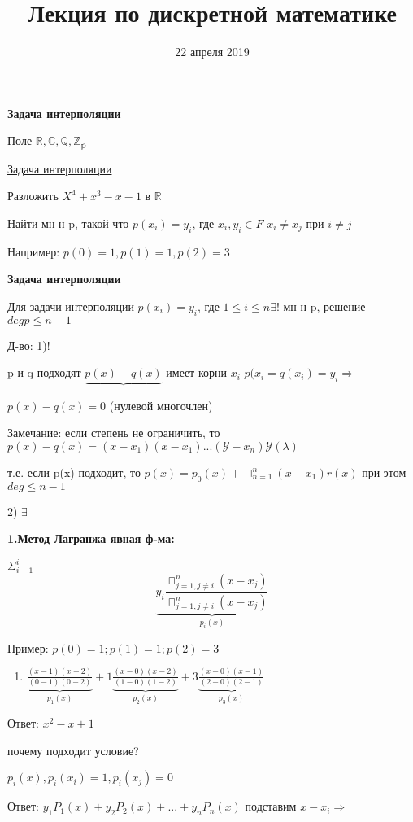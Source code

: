 \documentclass{article}
\title{Лекция по дискретной математике}
\date{22 апреля 2019}
\begin{document}
 
\maketitle
 
 
 \textbf{Задача интерполяции}
 
Поле $\mathds{R},\mathds{C},\mathds{Q},\mathds{Z_{p}}$

\underline{Задача интерполяции}

Разложить $ X^4+x^3-x-1$ в $\mathds{R}$

Найти мн-н p, такой что $p(x_{i})=y_{i}$, где $x_{i},y_{i} \in F$ $x_{i} \neq x_{j}$ при $i\neq j$

Например: $p(0)=1,p(1)=1,p(2)=3$

\textbf{Задача интерполяции}

Для задачи интерполяции $p(x_{i})=y_{i}$, где $1\leq i \leq n \exists !$ мн-н p, решение $deg p\leq n-1$

Д-во: 
1)!

p и q подходят $\underbrace{p(x)-q(x)}$ имеет корни $x_{i}$ $p(x_{i}=q(x{_i})=y_{i} \Rightarrow$

$p(x)-q(x)=0$ (нулевой многочлен)

Замечание: если степень не ограничить, то $p(x)-q(x)=(x-x_{1})(x-x_{1})...(\mathcal{Y}-x_{n})\mathcal{Y}(\lambda)$

т.е. если p(x) подходит, то $p(x)=p_{0}(x)+\sqcap^n_{n=1}(x-x_{1})r(x)$ при этом $deg\leq n-1$

2) $\exists$

\textbf{1.Метод Лагранжа явная ф-ма:}
 
$\Sigma^i_{i-1}$ $$\underbrace{ y_{i}\frac{\sqcap^n_{j=1, j\neq i}(x-x_{j})}{\sqcap^n_{j=1, j\neq i}(x-x_{j})}}_{p_{i}(x)}$$

Пример: $p(0)=1; p(1)=1; p(2)=3$

\begin{enumerate}

\item $\underbrace{\frac{(x-1)(x-2)}{(0-1)(0-2)}}_{p_1(x)}+1\underbrace{\frac{(x-0)(x-2)}{(1-0)(1-2)}}_{p_2(x)}+3\underbrace{\frac{(x-0)(x-1)}{(2-0)(2-1)}}_{p_3(x)}$ 

\end{enumerate}

Ответ: $x^2-x+1$

почему подходит условие? 

$p_i(x),p_i(x_i)=1,p_i(x_j)=0$

Ответ: $y_{1}P_1(x)+y_{2}P_2(x)+...+y_{n}P_n(x)$ подставим $x-x_i\Rightarrow$
\end{document}
